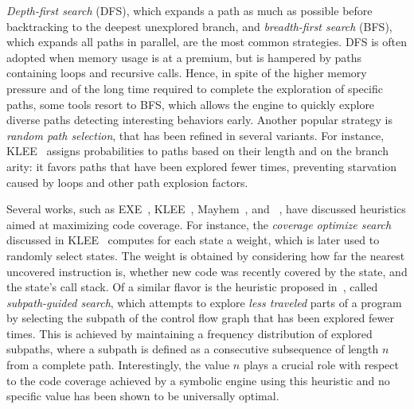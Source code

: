 
{\em Depth-first search} (DFS), which expands a path as much as possible before backtracking to the deepest unexplored branch, and {\em breadth-first search} (BFS), which expands all paths in parallel, are the most common strategies. DFS is often adopted when memory usage is at a premium, but is hampered by paths containing loops and recursive calls. Hence,  in spite of the higher memory pressure and of the long time required to complete the exploration of specific paths, some tools resort to BFS, which allows the engine to quickly explore diverse paths  detecting interesting behaviors early.  Another popular strategy is {\em random path selection}, that has been refined in several variants. For instance, {\sc KLEE}~\cite{KLEE-OSDI08} assigns probabilities to paths based on their length and on the branch arity: it favors paths that have been explored fewer times, preventing starvation caused by loops and other path explosion factors.

Several works, such as {\sc EXE}~\cite{EXE-CCS06}, {\sc KLEE}~\cite{KLEE-OSDI08}, {\sc Mayhem}~\cite{MAYHEM-SP12}, and {\sc \stwoe}~\cite{CKC-TOCS12}, have discussed heuristics aimed at maximizing code coverage. For instance, the {\em coverage optimize search} discussed in {\sc KLEE}~\cite{KLEE-OSDI08} computes for each state a weight, which is later used to randomly select states. The weight is obtained by considering how far the nearest uncovered instruction is, whether new code was recently covered by the state, and the state's call stack. Of a similar flavor is the heuristic proposed in~\cite{LZL-OOPSLA13}, called {\em subpath-guided search}, which attempts to explore {\it less traveled} parts of a program by selecting the subpath of the control flow graph that has been explored fewer times. This is achieved by maintaining a frequency distribution of explored subpaths, where a subpath is defined as a consecutive subsequence of length $n$ from a complete path. Interestingly, the value $n$ plays a crucial role with respect to the code coverage achieved by a symbolic engine using this heuristic and no specific value has been shown to be universally optimal. %

